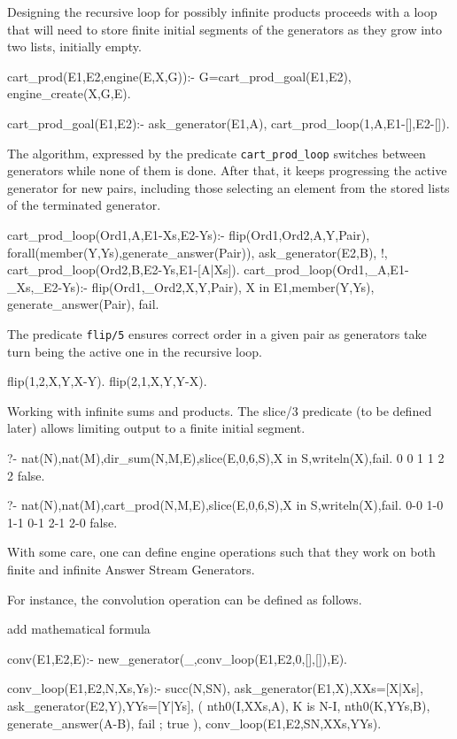 \documentclass{new_tlp}
\begin{document}
Designing the recursive loop for possibly infinite products
proceeds with a loop that will need to store finite initial 
segments of the generators as they grow into two lists, initially
empty.
\begin{code}
cart_prod(E1,E2,engine(E,X,G)):-
  G=cart_prod_goal(E1,E2),
  engine_create(X,G,E).

cart_prod_goal(E1,E2):-
  ask_generator(E1,A),
  cart_prod_loop(1,A,E1-[],E2-[]).
\end{code}

The algorithm, expressed by the predicate {\tt cart\_prod\_loop}
switches between generators while none of them is done.
After that, it keeps progressing the active generator 
for new pairs, including those selecting an element 
from the stored lists of the terminated generator.
\begin{code}
cart_prod_loop(Ord1,A,E1-Xs,E2-Ys):-
  flip(Ord1,Ord2,A,Y,Pair),
  forall(member(Y,Ys),generate_answer(Pair)),
  ask_generator(E2,B),
  !,
  cart_prod_loop(Ord2,B,E2-Ys,E1-[A|Xs]).
cart_prod_loop(Ord1,_A,E1-_Xs,_E2-Ys):-
  flip(Ord1,_Ord2,X,Y,Pair),
  X in E1,member(Y,Ys),
  generate_answer(Pair),
  fail.
\end{code}

The predicate {\tt flip/5} ensures correct order in a given pair
as  generators take turn being the active one in the recursive loop. 
\begin{code} 
flip(1,2,X,Y,X-Y).
flip(2,1,X,Y,Y-X).
\end{code}

\BX
Working with infinite sums and products. The slice/3 predicate (to be defined later) allows limiting output to a finite initial segment.
\begin{codex}
?- nat(N),nat(M),dir_sum(N,M,E),slice(E,0,6,S),X in S,writeln(X),fail.
0
0
1
1
2
2
false.

?- nat(N),nat(M),cart_prod(N,M,E),slice(E,0,6,S),X in S,writeln(X),fail.
0-0
1-0
1-1
0-1
2-1
2-0
false.
\end{codex}
\EX


With some care, one can define engine operations such that they work on both
finite and infinite Answer Stream Generators.

For instance, the convolution operation can be defined as follows.


{\Large add mathematical formula}

\begin{code}

conv(E1,E2,E):-
  new_generator(_,conv_loop(E1,E2,0,[],[]),E).

conv_loop(E1,E2,N,Xs,Ys):-
  succ(N,SN),
  ask_generator(E1,X),XXs=[X|Xs],
  ask_generator(E2,Y),YYs=[Y|Ys],
  ( nth0(I,XXs,A),
    K is N-I,
    nth0(K,YYs,B),
    generate_answer(A-B),
    fail
  ; true  
  ),
  conv_loop(E1,E2,SN,XXs,YYs).
\end{code}
\end{document}
